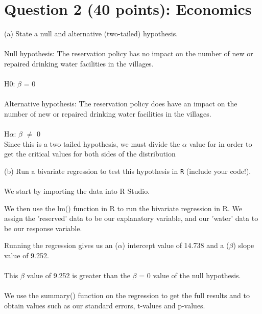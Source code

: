 \documentclass[12pt,letterpaper]{article}
\begin{document}
\newpage
\section*{Question 2 (40 points): Economics}
\vspace{.25cm}
 (a) State a null and alternative (two-tailed) hypothesis.
 \\
 \\
Null hypothesis: The reservation policy has no impact on the number of new or repaired drinking water facilities in the villages.
\\
\\
H0: $\beta$ = 0
 \\
 \\
Alternative hypothesis: The reservation policy does have an impact on the number of new or repaired drinking water facilities in the villages.
\\\\ 
H$\alpha$: $\beta$ $\neq$ 0
\\

Since this is a two tailed hypothesis, we must divide the $\alpha$ value for in order to get the critical values for both sides of the distribution

\newpage
(b) Run a bivariate regression to test this hypothesis in \texttt{R} (include your code!).
\\\\
We start by importing the data into R Studio. 




We then use the lm() function in R to run the bivariate regression in R. We assign the 'reserved' data to be our explanatory variable, and our 'water' data to be our response variable.



Running the regression gives us an ($\alpha$) intercept value of 14.738 and a ($\beta$) slope value of 9.252.
\\\\
This $\beta$ value of 9.252 is greater than the $\beta$ = 0 value of the null hypothesis.
\\\\
We use the summary() function on the regression to get the full results and to obtain values such as our standard errors, t-values and p-values. 
\end{document}
